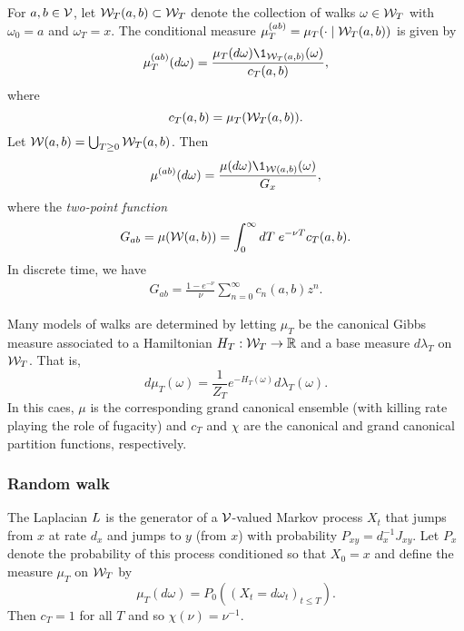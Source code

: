 For $a, b \in \mathcal{V}$, let $\mathcal{W}_T(a, b) \subset \mathcal{W}_T$ denote the collection of walks
$\omega \in \mathcal{W}_T$ with $\omega_0 = a$ and $\omega_T = x$.
The conditional measure $\mu^{(ab)}_T = \mu_T(\cdot \mid \mathcal{W}_T(a, b))$
is given by
\begin{equation}
\mu^{(ab)}_T(d\omega) = \frac{\mu_T(d\omega) \1_{\Wcal_T(a, b)}(\omega)}{c_T(a, b)},
\end{equation}
where
\begin{equation}
c_T(a, b) = \mu_T(\mathcal{W}_T(a, b)).
\end{equation}
Let $\mathcal{W}(a, b) = \bigcup_{T \ge 0} \mathcal{W}_T(a, b)$. Then
\begin{equation}
\mu^{(ab)}(d\omega) = \frac{\mu(d\omega) \1_{\Wcal(a, b)}(\omega)}{G_x},
\end{equation}
where the \emph{two-point function}
\begin{equation}
G_{ab} = \mu(\mathcal{W}(a, b)) = \int_0^\infty dT \; e^{-\nu T} c_T(a, b).
\end{equation}
In discrete time, we have
\begin{align}
G_{ab} = \frac{1 - e^{-\nu}}{\nu} \sum_{n=0}^\infty c_n(a, b) z^n.
\end{align}

Many models of walks are determined by letting $\mu_T$ be the canonical Gibbs measure
associated to a Hamiltonian $H_T : \mathcal{W}_T \rightarrow {\mathbb R}$ and a base measure $d\lambda_T$ on $\mathcal{W}_T$.
That is,
\begin{equation}
d\mu_T(\omega) = \frac{1}{Z_T} e^{-H_T(\omega)} d\lambda_T(\omega).
\end{equation}
In this caes, $\mu$ is the corresponding grand canonical ensemble (with killing rate playing
the role of fugacity) and $c_T$ and $\chi$
are the canonical and grand canonical partition functions, respectively.



\subsubsection{Random walk}

The Laplacian $L$ is the generator of a $\mathcal{V}$-valued Markov process $X_t$
that jumps from $x$ at rate $d_x$ and jumps to $y$ (from $x$) with probability
$P_{xy} = d_x^{-1} J_{xy}$. Let $P_x$ denote the probability of this process conditioned so
that $X_0 = x$ and define the measure $\mu_T$ on $\mathcal{W}_T$ by
\begin{equation}
\mu_T(d\omega) = P_0((X_t = d\omega_t)_{t \le T}).
\end{equation}
Then $c_T = 1$ for all $T$ and so $\chi(\nu) = \nu^{-1}$.

